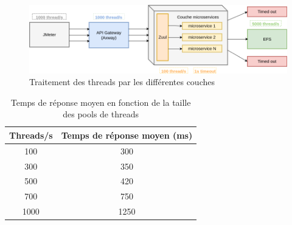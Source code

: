 \begin{figure}[h!]
	\includegraphics[scale=0.5]{images/travailNeuflizeOBC/testsFonc/testChargeProbleme.png}
	\centering
	\caption{Traitement des threads par les différentes couches}
	\label{testChargeProbleme}
\end{figure}

\begin{table}[h!]
	\center
	\begin{tabular}{| c | c |}
     \hline
     Threads/s & Temps de réponse moyen (ms)\\ \hline
     100 & 300 \\ \hline
     300 & 350 \\ \hline
     500 & 420 \\ \hline
     700 & 750 \\ \hline
     1000 & 1250 \\
     \hline
	\end{tabular}
	\caption{Temps de réponse moyen en fonction de la taille des pools de threads}
	\label{tableauThreads}
\end{table}